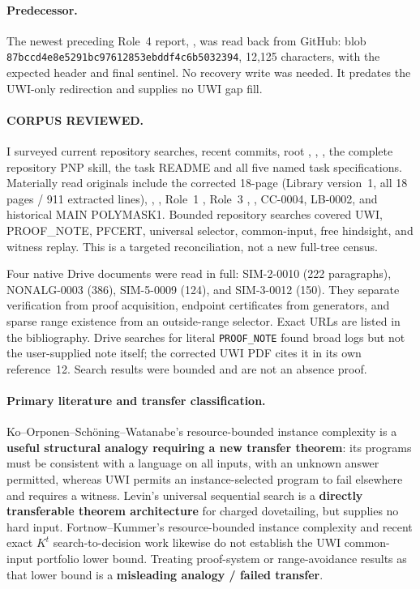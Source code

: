 \documentclass[11pt]{article}
\begin{document}
\paragraph{Predecessor.}
The newest preceding Role~4 report,
,
was read back from GitHub: blob \texttt{87bccd4e8e5291bc97612853ebddf4c6b5032394},
12,125 characters, with the expected header and final sentinel.  No recovery write
was needed.  It predates the UWI-only redirection and supplies no UWI gap fill.

\paragraph{CORPUS REVIEWED.}
I surveyed current repository searches, recent commits, root ,
, , the complete repository PNP skill, the task
README and all five named task specifications.  Materially read originals include
the corrected 18-page  (Library version~1,
all 18 pages / 911 extracted lines),
,
,
Role~1 , Role~3
,
,
CC-0004, LB-0002, and historical MAIN POLYMASK1.  Bounded repository searches
covered UWI, PROOF\_NOTE, PFCERT, universal selector, common-input, free hindsight,
and witness replay.  This is a targeted reconciliation, not a new full-tree census.

Four native Drive documents were read in full: SIM-2-0010 (222 paragraphs),
NONALG-0003 (386), SIM-5-0009 (124), and SIM-3-0012 (150).  They separate
verification from proof acquisition, endpoint certificates from generators, and
sparse range existence from an outside-range selector.  Exact URLs are listed in
the bibliography.  Drive searches for literal \texttt{PROOF\_NOTE} found broad
logs but not the user-supplied note itself; the corrected UWI PDF cites it in its
own reference~12.  Search results were bounded and are not an absence proof.

\paragraph{Primary literature and transfer classification.}
Ko--Orponen--Sch\"oning--Watanabe's resource-bounded instance complexity is a
\textbf{useful structural analogy requiring a new transfer theorem}: its programs
must be consistent with a language on all inputs, with an unknown answer permitted,
whereas UWI permits an instance-selected program to fail elsewhere and requires a
witness.  Levin's universal sequential search is a \textbf{directly transferable
theorem architecture} for charged dovetailing, but supplies no hard input.
Fortnow--Kummer's resource-bounded instance complexity and recent exact
$K^t$ search-to-decision work likewise do not establish the UWI common-input
portfolio lower bound.  Treating proof-system or range-avoidance results as that
lower bound is a \textbf{misleading analogy / failed transfer}.
\end{document}
